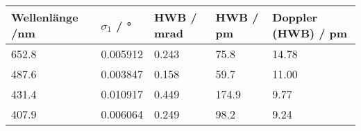 \begin{tabular}{lllll}
\toprule
Wellenlänge /\si{\nano\metre} & $\sigma_1$ / \si{\degree} & HWB / \si{\milli\radian} & HWB / \si{\pico\metre} & Doppler (HWB) / \si{\pico\metre} \\
\midrule
\num{652.8}& \num{0.005912}       & \num{0.243} & \num{75.8}  & \num{14.78} \\
\num{487.6}& \num{0.003847}       & \num{0.158} & \num{59.7}  & \num{11.00} \\
\num{431.4}& \num{0.010917}       & \num{0.449} & \num{174.9} & \num{9.77}  \\
\num{407.9}& \num{0.006064}       & \num{0.249} & \num{98.2}  & \num{9.24}  \\
\bottomrule
\end{tabular}
